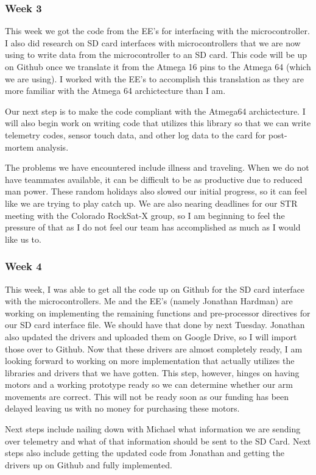 \subsubsection{Week 3}
This week we got the code from the EE's for interfacing with the microcontroller. I also did research on SD card 
interfaces with microcontrollers that we are now using to write data from the microcontroller to an SD card. This 
code will be up on Github once we translate it from the Atmega 16 pins to the Atmega 64 (which we are using). I worked
with the EE's to accomplish this translation as they are more familiar with the Atmega 64 archictecture than I am.

Our next step is to make the code compliant with the Atmega64 archictecture. I will also begin work on writing code
that utilizes this library so that we can write telemetry codes, sensor touch data, and other log data to the card
for post-mortem analysis.

The problems we have encountered include illness and traveling. When we do not have teammates available, it can be
difficult to be as productive due to reduced man power. These random holidays also slowed our initial progress, so
it can feel like we are trying to play catch up. We are also nearing deadlines for our STR meeting with the Colorado
RockSat-X group, so I am beginning to feel the pressure of that as I do not feel our team has accomplished as much
as I would like us to.

\subsubsection{Week 4}
This week, I was able to get all the code up on Github for the SD card interface with the microcontrollers. Me and 
the EE's (namely Jonathan Hardman) are working on implementing the remaining functions and pre-processor directives 
for our SD card interface file. We should have that done by next Tuesday. Jonathan also updated the drivers and 
uploaded 
them on Google Drive, so I will import those over to Github. Now that these drivers are almost completely ready, I am 
looking forward to working on more implementation that actually utilizes the libraries and drivers that we have 
gotten. This step, however, hinges on having motors and a working prototype ready so we can determine whether our
arm movements are correct. This will not be ready soon as our funding has been delayed leaving us with no money for 
purchasing these motors.

Next steps include nailing down with Michael what information we are sending over telemetry and what of that 
information should be sent to the SD Card. Next steps also include getting the updated code from Jonathan and getting
 the drivers up on Github and fully implemented.

